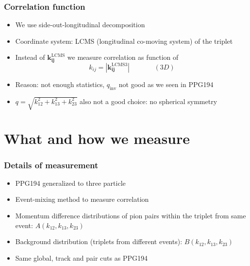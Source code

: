 \documentclass{beamer}
\begin{document}
\begin{frame}
\frametitle{Correlation function}
\begin{itemize}
\setlength{\itemsep}{20pt}
\item We use side-out-longitudinal decomposition 
\item Coordinate system: LCMS (longitudinal co-moving system) of the triplet
\item Instead of $\bm{k_{ij}^{\mathrm{LCMS}}}$ we measure correlation as function of 
\begin{equation*}
k_{ij}=|\bm{k_{ij}^{\mathrm{LCMS3}}}|\;\;\;\;\;\;\;\;\;\;\;\;\;(3D)
\end{equation*}
\item Reason: not enough statistics, $q_\mathrm{inv}$ not good as we seen in PPG194
\item $q=\sqrt{k_{12}^2+k_{13}^2+k_{23}^2}$ also not a good choice: no spherical symmetry
\end{itemize}
\end{frame}

\section{What and how we measure}
\begin{frame}
\frametitle{Details of measurement}
\begin{itemize}
\setlength{\itemsep}{22pt}
\item PPG194 generalized to three particle
\item Event-mixing method to measure correlation
\item Momentum difference distributions of pion pairs within the triplet from same event: $A(k_{12}, k_{13}, k_{23})$
\item Background distribution (triplets from different events): $B(k_{12}, k_{13}, k_{23})$
\item Same global, track and pair cuts as PPG194
\end{itemize}
\end{frame}
\end{document}

